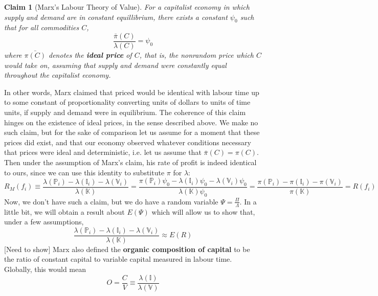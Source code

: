 \documentclass{article}
\theoremstyle{definition}
\theoremstyle{plain}
\theoremstyle{theorem}
\newtheorem{claim}{Claim}[section]
\begin{document}
\begin{claim}[Marx's Labour Theory of Value]
	For a capitalist economy in which supply and demand are in constant equillibrium, there exists a constant $\psi_0$ such that for all commodities $C$, 
	\[ \frac{\bar{\pi}(C)}{\lambda(C)} = \psi_0 \]
where $\bar{\pi(C)}$ denotes the \textbf{ideal price} of $C$, that is, the nonrandom price which $C$ would take on, assuming that supply and demand were constantly equal throughout the capitalist economy.
\end{claim}
In other words, Marx claimed that priced would be identical with labour time up to some constant of proportionality converting units of dollars to units of time units, if supply and demand were in equilibrium. The coherence of this claim hinges on the existence of ideal prices, in the sense described above. We make no such claim, but for the sake of comparison let us assume for a moment that these prices did exist, and that our economy observed whatever conditions necessary that prices were ideal and deterministic, i.e. let us assume that $\bar{\pi}(C) = \pi(C)$. Then under the assumption of Marx's claim, his rate of profit is indeed identical to ours, since we can use this identity to substitute $\pi$ for $\lambda$: 
\[ R_M(f_i) \equiv \frac{\lambda(\mathbb{P}_i)-\lambda(\mathbb{I}_i) - \lambda(\mathbb{V}_i)}{\lambda(\mathbb{K})} = \frac{\pi(\mathbb{P}_i)\psi_0-\lambda(\mathbb{I}_i)\psi_0 - \lambda(\mathbb{V}_i)\psi_0}{\lambda(\mathbb{K})\psi_0} = \frac{\pi(\mathbb{P}_i)-\pi(\mathbb{I}_i) - \pi(\mathbb{V}_i)}{\pi(\mathbb{K})} = R(f_i) \]
Now, we don't have such a claim, but we do have a random variable $\Psi = \frac{\Pi}{\Lambda}$. In a little bit, we will obtain a result about $E(\Psi)$ which will allow us to show that, under a few assumptions, 
\[ \frac{\lambda(\mathbb{P}_i)-\lambda(\mathbb{I}_i) - \lambda(\mathbb{V}_i)}{\lambda(\mathbb{K})} \approx E(R) \]
[Need to show]
Marx also defined the \textbf{organic composition of capital} to be the ratio of constant capital to variable capital measured in labour time. Globally, this would mean
\[ O = \frac{C}{V} \equiv \frac{\lambda(\mathbb{I})}{\lambda(\mathbb{V})} \]
\end{document}
